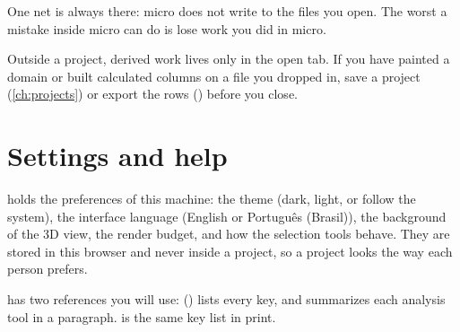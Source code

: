 One net is always there: micro does not write to the files you open. The worst a mistake inside micro can do is lose work you did in micro.

\begin{caution}
Outside a project, derived work lives only in the open tab. If you have painted a domain or built calculated columns on a file you dropped in, save a project (\cref{ch:projects}) or export the rows () before you close.
\end{caution}

\section{Settings and help}\label{sec:start-settings}
 holds the preferences of this machine: the theme (dark, light, or follow the system), the interface language (English or Português (Brasil)), the background of the 3D view, the render budget, and how the selection tools behave. They are stored in this browser and never inside a project, so a project looks the way each person prefers.

 has two references you will use:  () lists every key, and  summarizes each analysis tool in a paragraph.  is the same key list in print.
